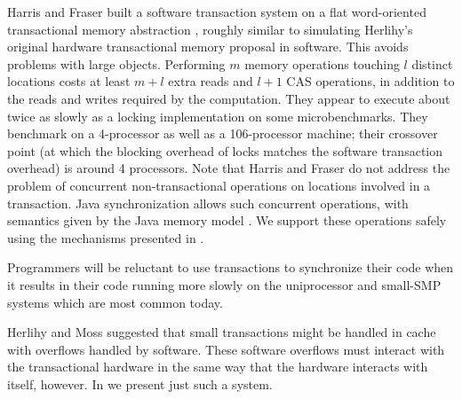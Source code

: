 Harris and Fraser built a software transaction system on a flat
word-oriented transactional memory abstraction \cite{HarrisFr03},
roughly similar to simulating Herlihy's original hardware
transactional memory proposal in software.  This avoids problems with
large objects.  Performing $m$ memory operations touching $l$ distinct
locations costs at least $m+l$ extra reads and $l+1$ CAS operations, in
addition to the reads and writes required by the computation.
They appear to execute about twice as slowly as a locking
implementation on some microbenchmarks.  They benchmark on a
4-processor as well as a 106-processor machine; their crossover point
(at which the blocking overhead of locks matches the software
transaction overhead) is around 4 processors.
Note that Harris and Fraser do not address the problem of
concurrent non-transactional operations on locations involved in a
transaction.  Java synchronization allows such concurrent operations,
with semantics given by the Java memory model \cite{MansonPu02}.
We support these operations safely using the mechanisms presented in
.

Programmers will be reluctant to use transactions to synchronize their
code when it results in their code running more slowly on the uniprocessor
and small-SMP systems which are most common today.

Herlihy and Moss \cite{HerlihyMo93} suggested that small transactions
might be handled in cache with overflows handled by software.  These
software overflows must interact with the transactional hardware in
the same way that the hardware interacts with itself, however.
In  we present just such a system.


